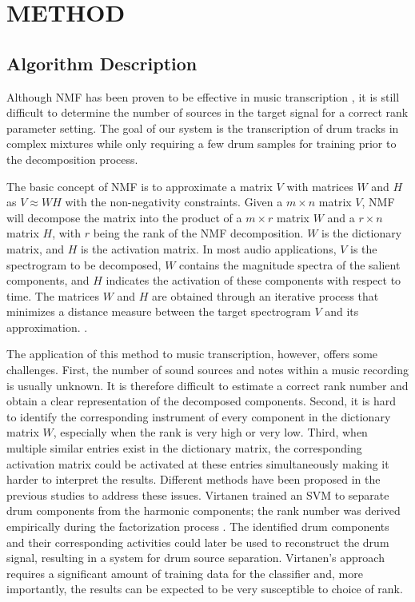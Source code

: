 \documentclass{article}
\begin{document}
\section{METHOD}\label{sec:method}
\subsection{Algorithm Description}\label{subsec:algorithm description}
Although NMF has been proven to be effective in music transcription \cite{smaragdis_non-negative_2003}, it is still difficult to determine the number of sources in the target signal for a correct rank parameter setting. The goal of our system is the transcription of drum tracks in complex mixtures while only requiring a few drum samples for training prior to the decomposition process. 

The basic concept of NMF is to approximate a matrix $V$ with matrices $W$ and $H$ as $V \approx WH$ with the non-negativity constraints. Given a $m \times n$ matrix $V$, NMF will decompose the matrix into the product of a $m \times r$ matrix $W$ and a $r \times n$ matrix $H$, with $r$ being the rank of the NMF decomposition. $W$ is the dictionary matrix, and $H$ is the activation matrix. In most audio applications, $V$ is the spectrogram to be decomposed, $W$ contains the magnitude spectra of the salient components, and $H$ indicates the activation of these components with respect to time. The matrices $W$ and $H$ are obtained through an iterative process that minimizes a distance measure between the target spectrogram $V$ and its approximation. \cite{lee_algorithms_2000}. 

The application of this method to music transcription, however, offers some challenges. 
First, the number of sound sources and notes within a music recording is usually unknown. It is therefore difficult to estimate a correct rank number and obtain a clear representation of the decomposed  components. 
Second, it is hard to identify the corresponding instrument of every component in the dictionary matrix $W$, especially when the rank is very high or very low. 
Third, when multiple similar entries exist in the dictionary matrix, the corresponding activation matrix could be activated at these entries simultaneously making it harder to interpret the results. %
Different methods have been proposed in the previous studies to address these issues. Virtanen trained an SVM to separate drum components from the harmonic components; the rank number was derived empirically during the factorization process \cite{helen_separation_2005}. The identified drum components and their corresponding activities could later be used to reconstruct the drum signal, resulting in a system for drum source separation. Virtanen's approach requires a significant amount of training data for the classifier and, more importantly, the results can be expected to be very susceptible to choice of rank. %
\end{document}
